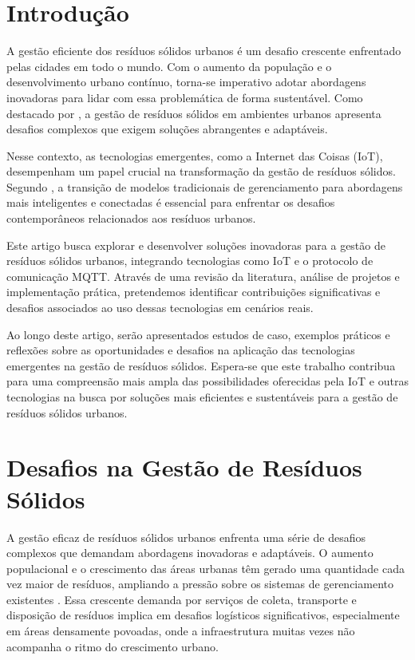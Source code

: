 \documentclass[12pt]{article}
\begin{document}
\section{Introdução}

A gestão eficiente dos resíduos sólidos urbanos é um desafio crescente enfrentado pelas cidades em todo o mundo. Com o aumento da população e o desenvolvimento urbano contínuo, torna-se imperativo adotar abordagens inovadoras para lidar com essa problemática de forma sustentável. Como destacado por \cite{anagnostopoulos2017challenges}, a gestão de resíduos sólidos em ambientes urbanos apresenta desafios complexos que exigem soluções abrangentes e adaptáveis.

Nesse contexto, as tecnologias emergentes, como a Internet das Coisas (IoT), desempenham um papel crucial na transformação da gestão de resíduos sólidos. Segundo \cite{Bouskela2016TheRT}, a transição de modelos tradicionais de gerenciamento para abordagens mais inteligentes e conectadas é essencial para enfrentar os desafios contemporâneos relacionados aos resíduos urbanos.

Este artigo busca explorar e desenvolver soluções inovadoras para a gestão de resíduos sólidos urbanos, integrando tecnologias como IoT e o protocolo de comunicação MQTT. Através de uma revisão da literatura, análise de projetos e implementação prática, pretendemos identificar contribuições significativas e desafios associados ao uso dessas tecnologias em cenários reais.

Ao longo deste artigo, serão apresentados estudos de caso, exemplos práticos e reflexões sobre as oportunidades e desafios na aplicação das tecnologias emergentes na gestão de resíduos sólidos. Espera-se que este trabalho contribua para uma compreensão mais ampla das possibilidades oferecidas pela IoT e outras tecnologias na busca por soluções mais eficientes e sustentáveis para a gestão de resíduos sólidos urbanos.

\section{Desafios na Gestão de Resíduos Sólidos} \label{sec:Desafios na Gestão de Resíduos Sólidos}

A gestão eficaz de resíduos sólidos urbanos enfrenta uma série de desafios complexos que demandam abordagens inovadoras e adaptáveis. O aumento populacional e o crescimento das áreas urbanas têm gerado uma quantidade cada vez maior de resíduos, ampliando a pressão sobre os sistemas de gerenciamento existentes \cite{hoornweg2012waste}. Essa crescente demanda por serviços de coleta, transporte e disposição de resíduos implica em desafios logísticos significativos, especialmente em áreas densamente povoadas, onde a infraestrutura muitas vezes não acompanha o ritmo do crescimento urbano.
\end{document}
